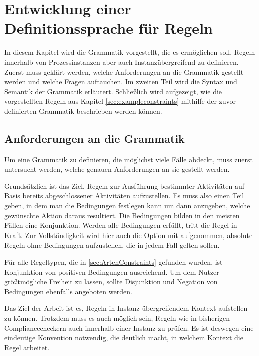 
\chapter{Entwicklung einer Definitionssprache für Regeln} %

\label{GrammatikKapitel} %


In diesem Kapitel wird die Grammatik vorgestellt, die es ermöglichen soll, Regeln innerhalb von Prozessinstanzen aber auch Instanzübergreifend zu definieren. Zuerst muss geklärt werden, welche Anforderungen an die Grammatik gestellt werden und welche Fragen auftauchen. Im zweiten Teil wird die Syntax und Semantik der Grammatik erläutert. Schließlich wird aufgezeigt, wie die vorgestellten Regeln aus Kapitel \ref{sec:exampleconstraints} mithilfe der zuvor definierten Grammatik beschrieben werden können.

%
%
\section{Anforderungen an die Grammatik}
Um eine Grammatik zu definieren, die möglichst viele Fälle abdeckt, muss zuerst untersucht werden, welche genauen Anforderungen an sie gestellt werden.

Grundsätzlich ist das Ziel, Regeln zur Ausführung bestimmter Aktivitäten auf Basis bereits abgeschlossener Aktivitäten aufzustellen. Es muss also einen Teil geben, in dem man die Bedingungen festlegen kann um dann anzugeben, welche gewünschte Aktion daraus resultiert. Die Bedingungen bilden in den meisten Fällen eine Konjunktion. Werden alle Bedingungen erfüllt, tritt die Regel in Kraft. Zur Vollständigkeit wird hier auch die Option mit aufgenommen, absolute Regeln ohne Bedingungen aufzustellen, die in jedem Fall gelten sollen.

Für alle Regeltypen, die in \ref{sec:ArtenConstraints} gefunden wurden, ist Konjunktion von positiven Bedingungen ausreichend. Um dem Nutzer größtmögliche Freiheit zu lassen, sollte Disjunktion und Negation von Bedingungen ebenfalls angeboten werden.

Das Ziel der Arbeit ist es, Regeln in Instanz-übergreifendem Kontext aufstellen zu können. Trotzdem muss es auch möglich sein, Regeln wie in bisherigen Compliancecheckern auch innerhalb einer Instanz zu prüfen. Es ist deswegen eine eindeutige Konvention notwendig, die deutlich macht, in welchem Kontext die Regel arbeitet.

